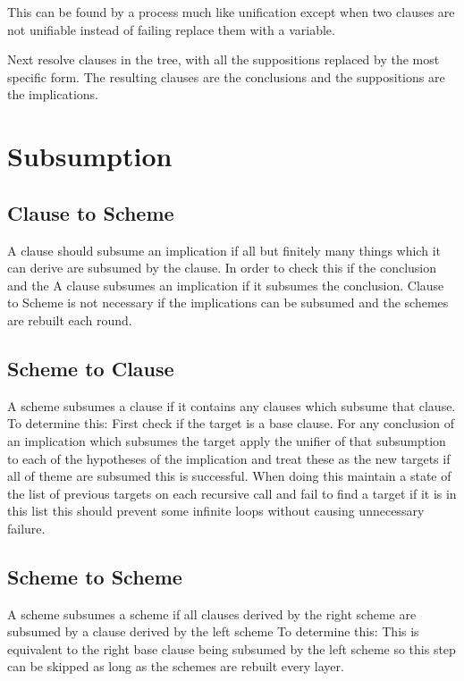 \documentclass{article}
\begin{document}
This can be found by a process much like unification except when two clauses are not unifiable instead 
  of failing replace them with a variable.

Next resolve clauses in the tree, with all the suppositions replaced by the most specific form.
The resulting clauses are the conclusions and the suppositions are the implications.


\section{Subsumption}

\subsection{Clause to Scheme}
  
  A clause should subsume an implication if all but finitely many things which it can derive are subsumed by the clause.
  In order to check this if the conclusion and the 
  A clause subsumes an implication if it subsumes the conclusion.
  Clause to Scheme is not necessary if the implications can be subsumed and the schemes are rebuilt each round.
 
\subsection{Scheme to Clause}
A scheme subsumes a clause if it contains any clauses which subsume that clause.
To determine this: 
  First check if the target is a base clause.
  For any conclusion of an implication which subsumes the target
    apply the unifier of that subsumption to each of the hypotheses of the implication and treat these as the new targets
    if all of theme are subsumed this is successful.
  When doing this maintain a state of the list of previous targets on each recursive call and fail to find a target if it is in this list
  this should prevent some infinite loops without causing unnecessary failure.

\subsection{Scheme to Scheme}

A scheme subsumes a scheme if all clauses derived by the right scheme are subsumed by a clause derived by the left scheme
To determine this:
  This is equivalent to the right base clause being subsumed by the left scheme
  so this step can be skipped as long as the schemes are rebuilt every layer.
\end{document}
